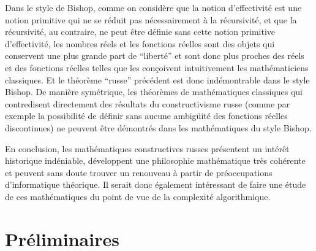 Dans le style de Bishop, comme on considère que la notion d'effectivité est une notion primitive qui ne se réduit pas nécessairement à la 
récursivité, et que la récursivité, au contraire, ne peut être définie sans cette notion primitive d'effectivité, les nombres réels et les fonctions réelles sont des objets qui conservent une plus grande part de 
``liberté'' et sont donc plus proches des réels et des fonctions réelles 
telles que les conçoivent intuitivement les mathématiciens classiques. 
Et le théorème ``russe'' précédent est donc indémontrable dans le style 
Bishop. De manière symétrique, les théorèmes de mathématiques 
classiques qui contredisent directement des résultats du 
constructivisme russe (comme par exemple la possibilité de définir sans 
aucune ambigüité des fonctions réelles discontinues) ne peuvent être 
démontrés dans les mathématiques du style Bishop. 

En conclusion, les mathématiques constructives russes présentent un 
intérêt historique indéniable, développent une philosophie 
mathématique très cohérente et peuvent sans doute trouver un renouveau à 
partir de préoccupations d'informatique théorique. Il serait donc également intéressant de faire une étude de ces mathématiques du point de vue de la complexité algorithmique.    

\section{Préliminaires}\label{fsec1}
